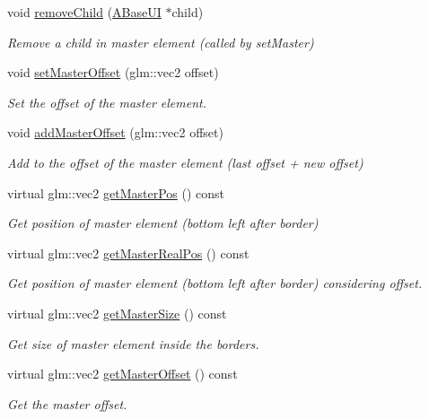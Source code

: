 \begin{DoxyCompactItemize}
void \hyperlink{class_a_base_master_u_i_a0965153a5bf1d5a7de71f65c2f8fcc0a}{remove\+Child} (\hyperlink{class_a_base_u_i}{A\+Base\+UI} $\ast$child)
\begin{DoxyCompactList}\small\item\em Remove a child in master element (called by set\+Master) \end{DoxyCompactList}\item 
void \hyperlink{class_a_base_master_u_i_ad98439ff88bce6f13311f17444aea6f3}{set\+Master\+Offset} (glm\+::vec2 offset)
\begin{DoxyCompactList}\small\item\em Set the offset of the master element. \end{DoxyCompactList}\item 
void \hyperlink{class_a_base_master_u_i_a384c412cf0c2fc3265d9dc6bcb7ff57e}{add\+Master\+Offset} (glm\+::vec2 offset)
\begin{DoxyCompactList}\small\item\em Add to the offset of the master element (last offset + new offset) \end{DoxyCompactList}\item 
virtual glm\+::vec2 \hyperlink{class_a_base_master_u_i_aec1bb7871f82b2bd41de4fe4486e4050}{get\+Master\+Pos} () const
\begin{DoxyCompactList}\small\item\em Get position of master element (bottom left after border) \end{DoxyCompactList}\item 
virtual glm\+::vec2 \hyperlink{class_a_base_master_u_i_a64cf45d76b377fd59ec19f1f1d53c0be}{get\+Master\+Real\+Pos} () const
\begin{DoxyCompactList}\small\item\em Get position of master element (bottom left after border) considering offset. \end{DoxyCompactList}\item 
virtual glm\+::vec2 \hyperlink{class_a_base_master_u_i_ad8e2ca2b3f67ca274e5dd0169e454e55}{get\+Master\+Size} () const
\begin{DoxyCompactList}\small\item\em Get size of master element inside the borders. \end{DoxyCompactList}\item 
virtual glm\+::vec2 \hyperlink{class_a_base_master_u_i_aeeea67741ab77e3d03c6a817fc3bb949}{get\+Master\+Offset} () const
\begin{DoxyCompactList}\small\item\em Get the master offset. \end{DoxyCompactList}\end{DoxyCompactItemize}
